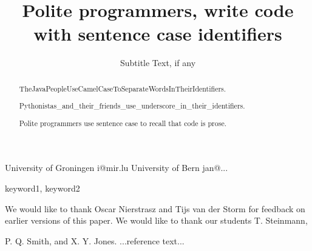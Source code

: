 \documentclass[preprint]{sigplanconf}
\begin{document}
\setlength{\pdfpageheight}{\paperheight}
\setlength{\pdfpagewidth}{\paperwidth}




\title{Polite programmers, write code with sentence case identifiers}
\subtitle{Subtitle Text, if any}

           {University of Groningen}
           {i@mir.lu}
           {University of Bern}
           {jan@...}

\maketitle

\begin{abstract}

\noindent
TheJavaPeopleUseCamelCaseToSeparateWordsInTheirIdentifiers. 

\noindent
Pythonistas\_and\_their\_friends\_use\_underscore\_in\_their\_identifiers. 

\noindent
Polite programmers use sentence case to recall that code is prose.
\end{abstract}
\vspace {1cm}

\keywords
keyword1, keyword2








\acks

We would like to thank Oscar Nierstrasz and Tijs van der Storm for feedback on earlier versions of this paper. We would like to thank our students T. Steinmann, 







\begin{thebibliography}{}
\softraggedright

P. Q. Smith, and X. Y. Jones. ...reference text...

\end{thebibliography}
\end{document}
